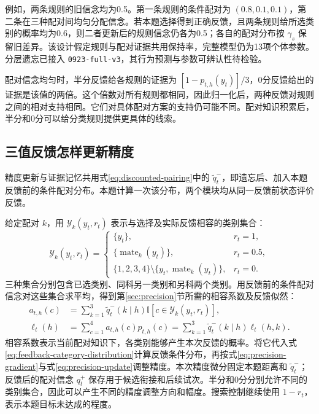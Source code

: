 \documentclass[12pt]{article}
\newcommand{\ind}{\mathbb I}
\begin{document}
例如，两条规则的旧信念均为0.5。第一条规则的条件配对为 $(0.8,0.1,0.1)$，第二条在三种配对间均匀分配信念。若本题选择得到正确反馈，且两条规则给所选类别的概率均为0.6，则二者更新后的规则信念仍各为0.5；各自的配对分布按 $\gamma_s$ 保留旧差异。该设计假定规则与配对证据共用保持率，完整模型仍为13项个体参数。分层遗忘已接入 \texttt{0923-full-v3}，其行为预测与参数可辨认性待检验。

配对信念均匀时，半分反馈给各规则的证据为 $[1-p_{t,h}(y_t)]/3$，0分反馈给出的证据是该值的两倍。这个倍数对所有规则都相同，因此归一化后，两种反馈对规则之间的相对支持相同。它们对具体配对方案的支持仍可能不同。配对知识积累后，半分和0分可以给分类规则提供更具体的线索。

\subsection{三值反馈怎样更新精度}
\label{sec:pairing-precision}

精度更新与证据记忆共用式\eqref{eq:discounted-pairing}中的 $\widetilde q_t^-$，即遗忘后、加入本题反馈前的条件配对分布。本题计算一次该分布，两个模块均从同一反馈前状态评价反馈。

给定配对 $k$，用 $\mathcal Y_k(y_t,r_t)$ 表示与选择及实际反馈相容的类别集合：
\begin{equation}
\mathcal Y_k(y_t,r_t)=
\begin{cases}
\{y_t\},&r_t=1,\\
\{\operatorname{mate}_k(y_t)\},&r_t=0.5,\\
\{1,2,3,4\}\setminus\{y_t,\operatorname{mate}_k(y_t)\},&r_t=0.
\end{cases}
\end{equation}
三种集合分别包含已选类别、同科另一类别和另科两个类别。用反馈前的条件配对信念对这些集合求平均，得到第\ref{sec:precision}节所需的相容系数及反馈似然：
\begin{align}
a_{t,h}(c)&=\sum_{k=1}^3\widetilde q_t^-(k\mid h)\ind[c\in\mathcal Y_k(y_t,r_t)],
\label{eq:ternary-feedback-compatibility}\\
\ell_t(h)&=\sum_{c=1}^4a_{t,h}(c)p_{t,h}(c)
=\sum_{k=1}^3\widetilde q_t^-(k\mid h)\ell_t(h,k).
\end{align}
相容系数表示当前配对知识下，各类别能够产生本次反馈的概率。将它代入式\eqref{eq:feedback-category-distribution}计算反馈条件分布，再按式\eqref{eq:precision-gradient}与式\eqref{eq:precision-update}调整精度。本次精度微分固定本题距离和 $\widetilde q_t^-$；反馈后的配对信念 $q_t^+$ 保存用于候选衔接和后续试次。半分和0分分别允许不同的类别集合，因此可以产生不同的精度调整方向和幅度。搜索控制继续使用 $1-r_t$，表示本题目标未达成的程度。
\end{document}
